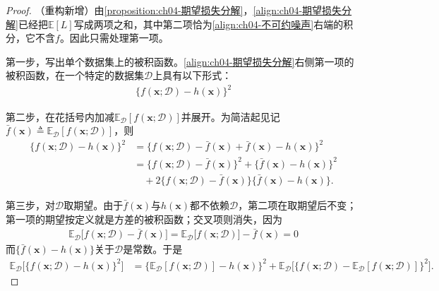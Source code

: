 \documentclass[../../main.tex]{subfiles}
\begin{document}
\begin{proof}
（重构新增）由\cref{proposition:ch04-期望损失分解}，\eqref{align:ch04-期望损失分解}已经把$\mathbb{E}[L]$写成两项之和，其中第二项恰为\eqref{align:ch04-不可约噪声}右端的积分，它不含$f$。因此只需处理第一项。

第一步，写出单个数据集上的被积函数。\eqref{align:ch04-期望损失分解}右侧第一项的被积函数，在一个特定的数据集$\mathcal{D}$上具有以下形式：
\begin{align}
  \{f(\boldsymbol{x};\mathcal{D})-h(\boldsymbol{x})\}^2
  \label{align:ch04-偏差方差被积函数}
\end{align}

第二步，在花括号内加减$\mathbb{E}_{\mathcal{D}}[f(\boldsymbol{x};\mathcal{D})]$并展开。为简洁起见记$\bar{f}(\boldsymbol{x})\triangleq\mathbb{E}_{\mathcal{D}}[f(\boldsymbol{x};\mathcal{D})]$，则
\begin{align}
  \{f(\boldsymbol{x};\mathcal{D})-h(\boldsymbol{x})\}^2
  &=\bigl\{f(\boldsymbol{x};\mathcal{D})-\bar{f}(\boldsymbol{x})+\bar{f}(\boldsymbol{x})-h(\boldsymbol{x})\bigr\}^2\nonumber\\
  &=\bigl\{f(\boldsymbol{x};\mathcal{D})-\bar{f}(\boldsymbol{x})\bigr\}^2
  +\bigl\{\bar{f}(\boldsymbol{x})-h(\boldsymbol{x})\bigr\}^2\nonumber\\
  &\quad+2\bigl\{f(\boldsymbol{x};\mathcal{D})-\bar{f}(\boldsymbol{x})\bigr\}\bigl\{\bar{f}(\boldsymbol{x})-h(\boldsymbol{x})\bigr\}.
  \label{align:ch04-偏差方差展开}
\end{align}

第三步，对$\mathcal{D}$取期望。由于$\bar{f}(\boldsymbol{x})$与$h(\boldsymbol{x})$都不依赖$\mathcal{D}$，第二项在取期望后不变；第一项的期望按定义就是方差的被积函数；交叉项则消失，因为
\begin{align*}
  \mathbb{E}_{\mathcal{D}}\bigl[f(\boldsymbol{x};\mathcal{D})-\bar{f}(\boldsymbol{x})\bigr]
  =\mathbb{E}_{\mathcal{D}}\bigl[f(\boldsymbol{x};\mathcal{D})\bigr]-\bar{f}(\boldsymbol{x})=0
\end{align*}
而$\{\bar{f}(\boldsymbol{x})-h(\boldsymbol{x})\}$关于$\mathcal{D}$是常数。于是
\begin{align}
  \mathbb{E}_{\mathcal{D}}\bigl[\{f(\boldsymbol{x};\mathcal{D})-h(\boldsymbol{x})\}^2\bigr]
  &=\bigl\{\mathbb{E}_{\mathcal{D}}[f(\boldsymbol{x};\mathcal{D})]-h(\boldsymbol{x})\bigr\}^2
  +\mathbb{E}_{\mathcal{D}}\bigl[\{f(\boldsymbol{x};\mathcal{D})-\mathbb{E}_{\mathcal{D}}[f(\boldsymbol{x};\mathcal{D})]\}^2\bigr].
  \label{align:ch04-偏差方差分解式}
\end{align}


\end{proof}
\end{document}
